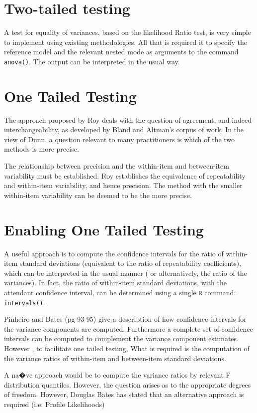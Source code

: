 \documentclass[12pt, a4paper]{report}
\begin{document}
\section{Two-tailed testing} A test for equality of variances, based on the likelihood Ratio test, is very simple to implement using existing methodologies. All that is required it to specify the reference model and the relevant nested mode as arguments to the command \texttt{anova()}. The output can be interpreted in the usual way.

\section{One Tailed Testing}
The approach proposed by Roy deals with the question of agreement, and indeed interchangeability, as developed by Bland and Altman's corpus of work. In the view of Dunn, a question relevant to many practitioners is which of the two methods is more precise.

The relationship between precision and the within-item and between-item variability must be established. Roy establishes the equivalence of repeatability and within-item variability, and hence precision.  The method with the smaller within-item variability can be deemed to be the more precise.

\section{Enabling One Tailed Testing}
A useful approach is to compute the confidence intervals for the ratio of within-item standard deviations (equivalent to the ratio of repeatability coefficients), which can be interpreted in the usual manner ( or alternatively, the ratio of the variances). In fact, the ratio of within-item standard deviations, with the attendant confidence interval,  can be determined using a single \texttt{R} command: \texttt{intervals()}.

Pinheiro and Bates (pg 93-95) give a description of how confidence intervals for the variance components are computed. Furthermore a complete set of confidence intervals can be computed to complement the variance component estimates.
However , to facilitate one tailed testing, What is required is the computation of the variance ratios of within-item and between-item standard deviations.

A na�ve approach would be to compute the variance ratios by relevant F distribution quantiles. However, the question arises as to the appropriate degrees of freedom. However, Douglas Bates has stated that an alternative approach is required (i.e. Profile Likelihoods)
\end{document}
